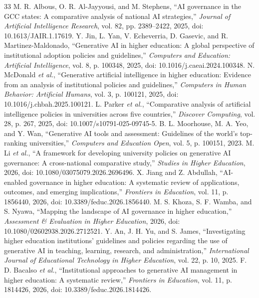 \documentclass[conference,letterpaper]{IEEEtran}
\begin{document}
\begin{thebibliography}{33}\footnotesize
{} M. R. Albous, O. R. Al-Jayyousi, and M. Stephens, ``AI governance in the GCC states: A comparative analysis of national AI strategies,'' \emph{Journal of Artificial Intelligence Research}, vol. 82, pp. 2389--2422, 2025, doi: 10.1613/JAIR.1.17619.
 Y. Jin, L. Yan, V. Echeverria, D. Gasevic, and R. Martinez-Maldonado, ``Generative AI in higher education: A global perspective of institutional adoption policies and guidelines,'' \emph{Computers and Education: Artificial Intelligence}, vol. 8, p. 100348, 2025, doi: 10.1016/j.caeai.2024.100348.
 N. McDonald \emph{et al.}, ``Generative artificial intelligence in higher education: Evidence from an analysis of institutional policies and guidelines,'' \emph{Computers in Human Behavior: Artificial Humans}, vol. 3, p. 100121, 2025, doi: 10.1016/j.chbah.2025.100121.
 L. Parker \emph{et al.}, ``Comparative analysis of artificial intelligence policies in universities across five countries,'' \emph{Discover Computing}, vol. 28, p. 267, 2025, doi: 10.1007/s10791-025-09745-5.
 B. L. Moorhouse, M. A. Yeo, and Y. Wan, ``Generative AI tools and assessment: Guidelines of the world's top-ranking universities,'' \emph{Computers and Education Open}, vol. 5, p. 100151, 2023.
 M. Li \emph{et al.}, ``A framework for developing university policies on generative AI governance: A cross-national comparative study,'' \emph{Studies in Higher Education}, 2026, doi: 10.1080/03075079.2026.2696496.
 X. Jiang and Z. Abdullah, ``AI-enabled governance in higher education: A systematic review of applications, outcomes, and emerging implications,'' \emph{Frontiers in Education}, vol. 11, p. 1856440, 2026, doi: 10.3389/feduc.2026.1856440.
 M. S. Khoza, S. F. Wamba, and S. Nyawa, ``Mapping the landscape of AI governance in higher education,'' \emph{Assessment \& Evaluation in Higher Education}, 2026, doi: 10.1080/02602938.2026.2712521.
 Y. An, J. H. Yu, and S. James, ``Investigating higher education institutions' guidelines and policies regarding the use of generative AI in teaching, learning, research, and administration,'' \emph{International Journal of Educational Technology in Higher Education}, vol. 22, p. 10, 2025.
 F. D. Bacalso \emph{et al.}, ``Institutional approaches to generative AI management in higher education: A systematic review,'' \emph{Frontiers in Education}, vol. 11, p. 1814426, 2026, doi: 10.3389/feduc.2026.1814426.

\end{thebibliography}
\end{document}
